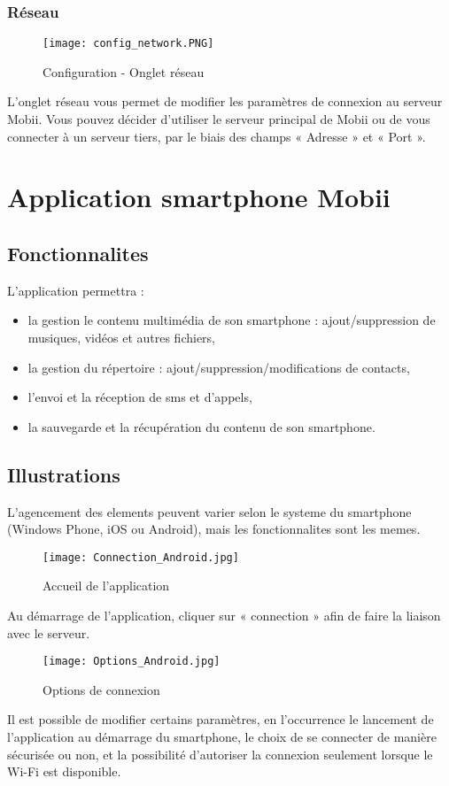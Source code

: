 \documentclass{koala-fr}
\begin{document}
\subsection{Réseau}

\begin{figure}[!ht]
  \center
  \texttt{[image: config\_network.PNG]}
  \caption{Configuration - Onglet réseau}
\end{figure}

L’onglet réseau vous permet de modifier les paramètres de connexion au serveur Mobii. Vous pouvez décider d’utiliser le serveur principal de Mobii ou de vous connecter à un serveur tiers, par le biais des champs « Adresse » et « Port ».

\chapter{Application smartphone Mobii}
\section{Fonctionnalites}
L'application permettra :
\begin{itemize}
  \item la gestion le contenu multimédia de son smartphone : ajout/suppression de musiques, vidéos et autres fichiers,
  \item la gestion du répertoire : ajout/suppression/modifications de contacts,
  \item l’envoi et la réception de sms et d’appels,
  \item la sauvegarde et la récupération du contenu de son smartphone.
\end{itemize}

\section{Illustrations}
L'agencement des elements peuvent varier selon le systeme du smartphone (Windows Phone, iOS ou Android), mais les fonctionnalites sont les memes.

\begin{figure}[!ht]
  \center
  \texttt{[image: Connection\_Android.jpg]}
  \caption{Accueil de l'application}
\end{figure}

Au démarrage de l’application, cliquer sur « connection » afin de faire la liaison avec le serveur.

\begin{figure}[!ht]
  \center
  \texttt{[image: Options\_Android.jpg]}
  \caption{Options de connexion}
\end{figure}

Il est possible de modifier certains paramètres, en l’occurrence le lancement de l’application au démarrage du smartphone, le choix de se connecter de manière sécurisée ou non, et la possibilité d’autoriser la connexion seulement lorsque le Wi-Fi est disponible.
\end{document}

